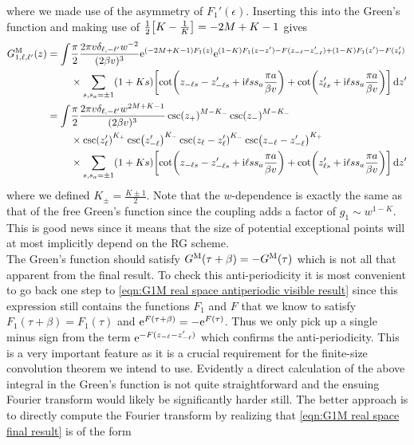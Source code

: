 \documentclass[english, parskip=full]{scrartcl}
\begin{document}
where we made use of the asymmetry of $F_1'(\epsilon)$.
Inserting this into the Green's function and making use of $\frac{1}{2}\klb*{K-\frac{1}{K}} = -2M+K-1$ gives
\begin{align}
G_{1,\ell,\ell'}^\M(z) &= \bsplit{\int &\frac{\pi}{2} \frac{2\pi v \delta_{\ell,-\ell'} w^{-2}}{(2\beta v)^3}\powe{(-2M+K-1)F_1(z)} \powe{(1-K) F_1(z-z') - F(z_{-\ell}-z_{-\ell}') + (1-K) F_1(z') - F(z_\ell')}\\
&\times \sum_{s,s_a=\pm 1} (1+Ks) \klb*{\cot\kla*{z_{-\ell s}-z_{-\ell s}' + \i \ell ss_a \frac{\pi a}{\beta v}} + \cot\kla*{z_{\ell s}' + \i \ell ss_a\frac{\pi a}{\beta v}}}\,\d z'} \label{eqn:G1M real space antiperiodic visible result}\\
&= \bsplit{\int &\frac{\pi}{2} \frac{2\pi v \delta_{\ell,-\ell'} w^{2M+K-1}}{(2\beta v)^3} \csc(z_+)^{M-K_-} \csc(z_-)^{M-K_-} \\
&\times \csc(z_\ell')^{K_+} \csc(z_{-\ell}')^{K_-}  \csc(z_\ell-z_\ell')^{K_-} \csc(z_{-\ell}-z_{-\ell}')^{K_+} \\
&\times \sum_{s,s_a=\pm 1} (1+Ks) \klb*{\cot\kla*{z_{-\ell s}-z_{-\ell s}' + \i \ell ss_a \frac{\pi a}{\beta v}} + \cot\kla*{z_{\ell s}' + \i \ell ss_a\frac{\pi a}{\beta v}}}\,\d z'} \label{eqn:G1M real space final result}
\end{align}
where we defined $K_\pm = \frac{K\pm 1}{2}$.
Note that the $w$-dependence is exactly the same as that of the free Green's function since the coupling adds a factor of $g_1\sim w^{1-K}$.
This is good news since it means that the size of potential exceptional points will at most implicitly depend on the RG scheme.\\
The Green's function should satisfy $G^{\text{M}}(\tau+\beta)=-G^{\text{M}}(\tau)$ which is not all that apparent from the final result.
To check this anti-periodicity it is most convenient to go back one step to \autoref{eqn:G1M real space antiperiodic visible result} since this expression still contains the functions $F_1$ and $F$ that we know to satisfy $F_1(\tau+\beta)=F_1(\tau)$ and $\text{e}^{F(\tau+\beta)} = -\text{e}^{F(\tau)}$.
Thus we only pick up a single minus sign from the term $\text{e}^{-F(z_{-\ell}-z_{-\ell}')}$ which confirms the anti-periodicity.
This is a very important feature as it is a crucial requirement for the finite-size convolution theorem we intend to use.
Evidently a direct calculation of the above integral in the Green's function is not quite straightforward and the ensuing Fourier transform would likely be significantly harder still.
The better approach is to directly compute the Fourier transform by realizing that \autoref{eqn:G1M real space final result} is of the form
\end{document}
